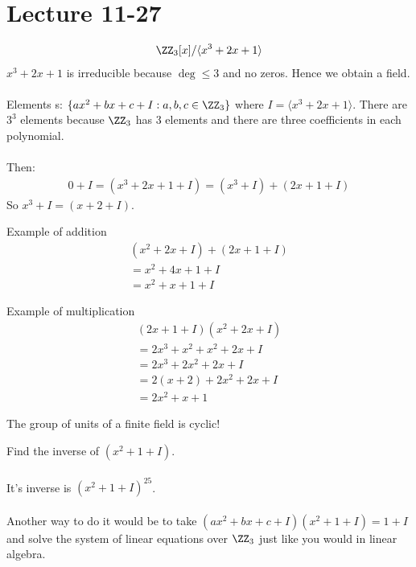 \documentclass[class=scrartcl, crop=false]{standalone}
\date{2019-11-27}
\begin{document}
\section{Lecture 11-27}

\begin{example}
  \begin{gather*}
    \ZZ_3[x] / \langle x^3 + 2x + 1 \rangle 
  \end{gather*} 
  $x^3 + 2x + 1$ is irreducible because $\deg \leq 3$ and no zeros. Hence we obtain a field.
  \\\\
  Elements s: $\{ax^2 + bx + c + I : a, b, c \in \ZZ_3 \}$ where $I = \langle x^3 + 2x + 1 \rangle $. There are $3^3$ elements because $\ZZ_3$ has 3 elements and there are three coefficients in each polynomial.
  \\\\
  Then:
  \begin{gather*}
    0 + I = (x^3 + 2x + 1 + I) = (x^3 + I) + (2x + 1 + I)
  \end{gather*} 
  So $x^3 + I = (x + 2 + I)$.

\end{example} 

\begin{example}
  Example of addition
  \begin{gather*}
    (x^2 + 2x + I) + (2x + 1 + I) \\
    = x^2 + 4x + 1 + I \\
    = x^2 + x + 1 + I
  \end{gather*} 
\end{example} 
\begin{example}
  Example of multiplication
  \begin{gather*}
    (2x + 1 + I)(x^2 + 2x + I) \\
    = 2x^3 + x^2 + x^2 + 2x + I \\
    = 2x^3 + 2x^2 + 2x + I \\
    = 2(x + 2) + 2x^2 + 2x + I \\
    = 2x^2 + x + 1
  \end{gather*} 
\end{example} 

\begin{fact}
  The group of units of a finite field is cyclic!
\end{fact} 

\begin{exercise}
  Find the inverse of $(x^2 + 1 + I)$.
  \\\\
  It's inverse is $(x^2 + 1 + I)^25$.
  \\\\
  Another way to do it would be to take $(ax^2 + bx + c + I)(x^2 + 1 + I) = 1 + I$ and solve the system of linear equations over $\ZZ_3$ just like you would in linear algebra.
\end{exercise} 
\end{document}

